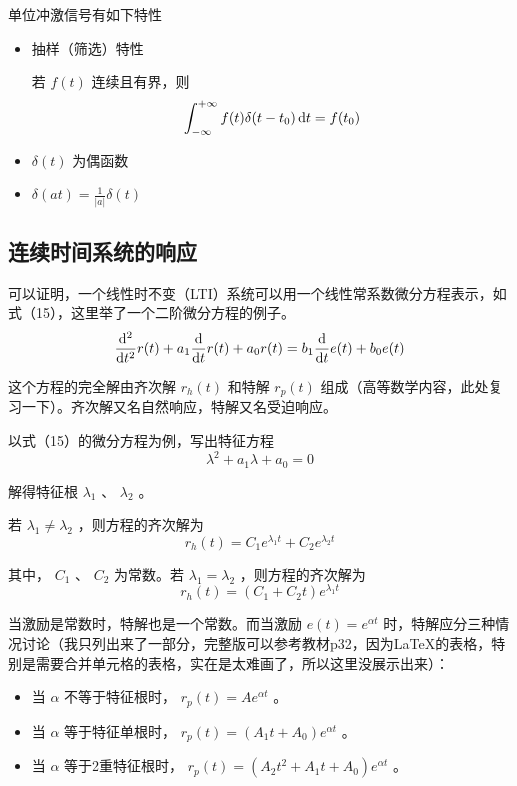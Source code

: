 \documentclass[UTF8,a4paper,11pt]{article}
\begin{document}
单位冲激信号有如下特性
\begin{itemize}
\item 抽样（筛选）特性

若 $f(t)$ 连续且有界，则
\begin{equation}
\int_{-\infty}^{+\infty} {f(t)\delta(t-t_0)} \,{\rm d}t=f(t_0)
\end{equation}

\item $\delta(t)$ 为偶函数

\item $\delta(at)=\frac{1}{\left | a \right |}\delta(t)$
\end{itemize}

\subsection{连续时间系统的响应}
可以证明，一个线性时不变（LTI）系统可以用一个线性常系数微分方程表示，如式（15），这里举了一个二阶微分方程的例子。
\begin{equation}
\frac{{\rm d}^2}{{\rm d}t^2}r(t)+a_1\frac{{\rm d}}{{\rm d}t}r(t)+a_0r(t)=b_1\frac{{\rm d}}{{\rm d}t}e(t)+b_0e(t)
\end{equation}

这个方程的完全解由齐次解 $r_h(t)$ 和特解 $r_p(t)$ 组成（高等数学内容，此处复习一下）。齐次解又名自然响应，特解又名受迫响应。

以式（15）的微分方程为例，写出特征方程
\begin{equation}
\lambda^2+a_1\lambda+a_0=0 
\end{equation}

解得特征根 $\lambda_1$ 、 $\lambda_2$ 。

若 $\lambda_1\ne\lambda_2$ ，则方程的齐次解为
\begin{equation}
r_h(t)=C_1e^{\lambda_1t}+C_2e^{\lambda_2t}
\end{equation}

其中， $C_1$ 、 $C_2$ 为常数。若 $\lambda_1=\lambda_2$ ，则方程的齐次解为
\begin{equation}
r_h(t)=(C_1+C_2t)e^{\lambda_1t}
\end{equation}

当激励是常数时，特解也是一个常数。而当激励 $e(t)=e^{\alpha t}$ 时，特解应分三种情况讨论（我只列出来了一部分，完整版可以参考教材p32，因为\LaTeX 的表格，特别是需要合并单元格的表格，实在是太难画了，所以这里没展示出来）：
\begin{itemize}
\item 当 $\alpha$ 不等于特征根时， $r_p(t)=Ae^{\alpha t}$ 。
\item 当 $\alpha$ 等于特征单根时， $r_p(t)=(A_1t+A_0)e^{\alpha t}$ 。
\item 当 $\alpha$ 等于2重特征根时， $r_p(t)=(A_2t^2+A_1t+A_0)e^{\alpha t}$ 。
\end{itemize} 
\end{document}
